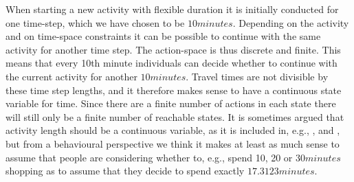 When starting a new activity with flexible duration it is initially conducted for one time-step, which we have chosen to be $10\unit{minutes}$. Depending on the activity and on time-space constraints it can be possible to continue with the same activity for another time step. The action-space is thus discrete and finite. This means that every 10th minute individuals can decide whether to continue with the current activity for another $10\unit{minutes}$. Travel times are not divisible by these time step lengths, and it therefore makes sense to have a continuous state variable for time. Since there are a finite number of actions in each state there will still only be a finite number of reachable states. It is sometimes argued that activity length should be a continuous variable, as it is included in, e.g., \citep{Habib11RUM}, \citep{Pinjari10} and \citep{Recker13}, but from a behavioural perspective we think it makes at least as much sense to assume that people are considering whether to, e.g., spend 10, 20 or $30\unit{minutes}$ shopping as to assume that they decide to spend exactly $17.3123\unit{minutes}$. 


